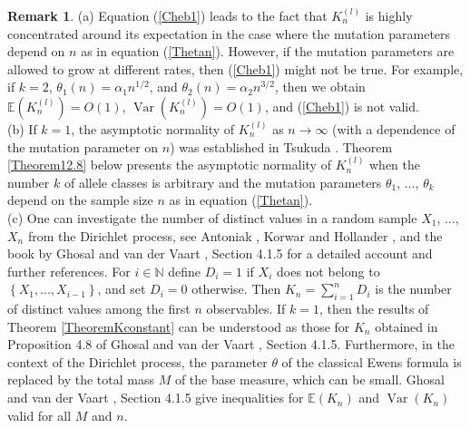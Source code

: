 \documentclass[12pt]{amsart}
\theoremstyle{definition}
\newtheorem{rem}[thm]{Remark}
\numberwithin{equation}{section}
\DeclareMathOperator{\Var}{Var}
\begin{document}
\begin{rem}
(a) Equation (\ref{Cheb1}) leads to the fact that $K_n^{(l)}$
is highly concentrated around its expectation in the case where the mutation parameters depend on $n$ as in equation
(\ref{Thetan}). However, if the mutation parameters are allowed to grow at different rates, then (\ref{Cheb1})
might not be true. For example, if $k=2$,
$\theta_1(n)=\alpha_1n^{1/2}$, and $\theta_2(n)=\alpha_2n^{3/2}$, then we obtain
$\mathbb{E}\left(K_n^{(l)}\right)=O(1)$, $\Var\left(K_n^{(l)}\right)=O(1)$, and (\ref{Cheb1})
is not valid.\\
(b)
If $k=1$, the asymptotic normality of $K_n^{(l)}$
as $n\rightarrow\infty$ (with a dependence of the mutation parameter on $n$) was established in Tsukuda \cite{Tsukuda}.
Theorem \ref{Theorem12.8} below presents the asymptotic normality of $K_n^{(l)}$ when the number $k$ of allele classes is arbitrary and the mutation parameters
$\theta_1$, $\ldots$, $\theta_k$ depend on the sample size $n$
as in equation (\ref{Thetan}).\\
(c) One can investigate the number of distinct values in a random sample $X_1$, $\ldots$, $X_n$ from the Dirichlet process, see Antoniak \cite{Antoniak}, Korwar and Hollander \cite{KorwarHollander}, and the book by  Ghosal and van der Vaart \cite{GhosalvanderVaart},
Section 4.1.5 for a detailed account and  further references. For $i\in\mathbb{N}$ define
$D_i=1$ if $X_i$ does not belong to $\left\{X_1,\ldots,X_{i-1}\right\}$, and set $D_i=0$ otherwise.
Then $K_n=\sum\limits_{i=1}^nD_i$ is the number of distinct values among the first $n$ observables.
If $k=1$, then the results of Theorem \ref{TheoremKconstant} can be understood as those for $K_n$
obtained in Proposition 4.8 of Ghosal and van der Vaart \cite{GhosalvanderVaart},
Section 4.1.5.  Furthermore, in the context of the Dirichlet process, the parameter $\theta$ of the classical Ewens formula is replaced by the total mass $M$ of the base measure, which can be small.  Ghosal and van der Vaart \cite{GhosalvanderVaart},
Section 4.1.5 give inequalities for $\mathbb{E}\left(K_n\right)$ and $\Var\left(K_n\right)$ valid for all $M$ and $n$.
\end{rem}
\end{document}
